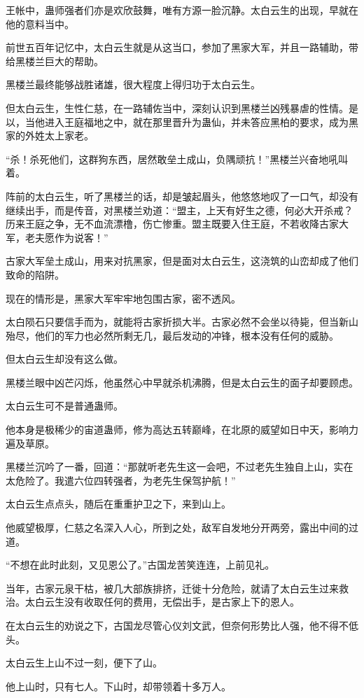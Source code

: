 \begin{this_body}
王帐中，蛊师强者们亦是欢欣鼓舞，唯有方源一脸沉静。太白云生的出现，早就在他的意料当中。

前世五百年记忆中，太白云生就是从这当口，参加了黑家大军，并且一路辅助，带给黑楼兰巨大的帮助。

黑楼兰最终能够战胜诸雄，很大程度上得归功于太白云生。

但太白云生，生性仁慈，在一路辅佐当中，深刻认识到黑楼兰凶残暴虐的性情。是以，当他进入王庭福地之中，就在那里晋升为蛊仙，并未答应黑柏的要求，成为黑家的外姓太上家老。

“杀！杀死他们，这群狗东西，居然敢垒土成山，负隅顽抗！”黑楼兰兴奋地吼叫着。

阵前的太白云生，听了黑楼兰的话，却是皱起眉头，他悠悠地叹了一口气，却没有继续出手，而是传音，对黑楼兰劝道：“盟主，上天有好生之德，何必大开杀戒？历来王庭之争，无不血流漂橹，伤亡惨重。盟主既要入住王庭，不若收降古家大军，老夫愿作为说客！”

古家大军垒土成山，用来对抗黑家，但是面对太白云生，这浇筑的山峦却成了他们致命的陷阱。

现在的情形是，黑家大军牢牢地包围古家，密不透风。

太白陨石只要信手而为，就能将古家折损大半。古家必然不会坐以待毙，但当新山殆尽，他们的军力也必然所剩无几，最后发动的冲锋，根本没有任何的威胁。

但太白云生却没有这么做。

黑楼兰眼中凶芒闪烁，他虽然心中早就杀机沸腾，但是太白云生的面子却要顾虑。

太白云生可不是普通蛊师。

他本身是极稀少的宙道蛊师，修为高达五转巅峰，在北原的威望如日中天，影响力遍及草原。

黑楼兰沉吟了一番，回道：“那就听老先生这一会吧，不过老先生独自上山，实在太危险了。我遣六位四转强者，为老先生保驾护航！”

太白云生点点头，随后在重重护卫之下，来到山上。

他威望极厚，仁慈之名深入人心，所到之处，敌军自发地分开两旁，露出中间的过道。

“不想在此时此刻，又见恩公了。”古国龙苦笑连连，上前见礼。

当年，古家元泉干枯，被几大部族排挤，迁徙十分危险，就请了太白云生过来救治。太白云生没有收取任何的费用，无偿出手，是古家上下的恩人。

在太白云生的劝说之下，古国龙尽管心仪刘文武，但奈何形势比人强，他不得不低头。

太白云生上山不过一刻，便下了山。

他上山时，只有七人。下山时，却带领着十多万人。


\end{this_body}
